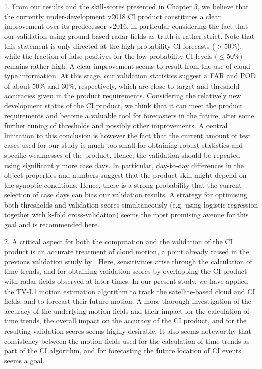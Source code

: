 1. From our results and the skill-scores presented in Chapter 5, we believe that the currently under-development v2018 CI product constitutes a clear improvement over its predecessor v2016, in particular considering the fact that our validation using ground-based radar fields as truth is rather strict. Note that this statement is only directed at the high-probability CI forecasts ($>50\%$), while the fraction of false positives for the low-probability CI levels ($\leq50\%$) remains rather high. A clear improvement seems to result from the use of cloud-type information. At this stage, our validation statistics suggest a FAR and POD of about 50\% and 30\%, respectively, which are close to target and threshold accuracies given in the product requirements. Considering the relatively new development status of the CI product, we think that it can meet the product requirements and become a valuable tool for forecasters in the future, after some further tuning of thresholds and possibly other improvements. A central limitation to this conclusion is however the fact that the current amount of test cases used for our study is much too small for obtaining robust statistics and  specific weaknesses of the product. Hence, the validation should be repeated using significantly more case days. In particular, day-to-day differences in the object properties and numbers suggest that the product skill might depend  on the synoptic conditions. Hence, there is a strong probability that the current selection of case days can bias our validation results. A strategy for optimising both thresholds  and validation scores simultaneously (e.g. using logistic regression together with k-fold cross-validation) seems the most promising avenue for this goal and is recommended here.

2. A critical aspect for both the computation and the validation of the CI product is an accurate treatment of cloud motion, a point already raised in the previous validation study by \citet{Karagiannidis2016}. Here, sensitivities arise through the calculation of time trends, and for obtaining validation scores by overlapping the CI product with radar fields observed at later times. In our present study, we have applied the TV-L1 motion estimation algorithm to track the satellite-based cloud and CI fields, and to forecast their future motion. A more thorough investigation of the accuracy of the underlying motion fields and their impact for the calculation of time trends, the overall impact on the accuracy of the CI product, and for the resulting validation scores seems highly desirable. It also seems noteworthy that consistency between the motion fields used for the calculation of time trends as part of the CI algorithm, and for forecasting the future location of CI events seems a goal.  

